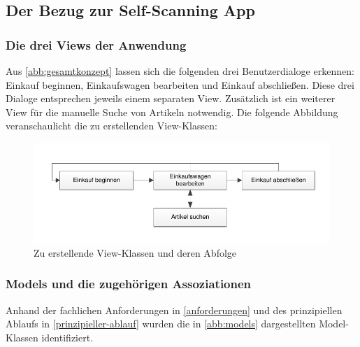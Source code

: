 


\subsection{Der Bezug zur Self-Scanning App}
\subsubsection*{Die drei Views der Anwendung}
Aus \vref{abb:gesamtkonzept} lassen sich die folgenden drei Benutzerdialoge erkennen: Einkauf beginnen, Einkaufswagen bearbeiten und Einkauf abschließen. Diese drei Dialoge entsprechen jeweils einem separaten View. Zusätzlich ist ein weiterer View für die manuelle Suche von Artikeln notwendig. Die folgende Abbildung veranschaulicht die zu erstellenden View-Klassen:

\begin{figure}[H]
	\includegraphics[width=\linewidth]{res/entwurf-views.pdf}
	\caption{Zu erstellende View-Klassen und deren Abfolge\protect\footnotemark}
\end{figure}

\protect{}

\subsubsection*{Models und die zugehörigen Assoziationen}
Anhand der fachlichen Anforderungen in \ref{anforderungen} und des prinzipiellen Ablaufs in \ref{prinzipieller-ablauf} wurden die in \ref{abb:models} dargestellten Model-Klassen identifiziert.

